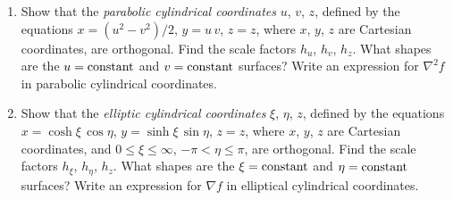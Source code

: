 {\begin{enumerate}
\item Show that the {\em parabolic cylindrical coordinates}\/ $u$, $v$, $z$, defined
by the equations $x=(u^2-v^2)/2$, $y=u\,v$, $z=z$, where $x$, $y$, $z$ are Cartesian
coordinates, are orthogonal. Find the scale factors $h_u$, $h_v$, $h_z$.
What shapes are the $u={\rm constant}$ and $v={\rm constant}$ surfaces?
Write an expression for $\nabla^2 f$ in parabolic cylindrical coordinates.

\item Show that the {\em elliptic cylindrical coordinates}\/ $\xi$, $\eta$, $z$, defined
by the equations $x=\cosh\xi\,\cos\eta$, $y=\sinh\xi\,\sin\eta$, $z=z$, where $x$, $y$, $z$ are Cartesian
coordinates, and $0\leq \xi\leq \infty$, $-\pi<\eta \leq \pi$, are orthogonal. Find the scale factors $h_\xi$, $h_\eta$, $h_z$.
What  shapes are the $\xi={\rm constant}$ and $\eta={\rm constant}$ surfaces?
Write an expression for $\nabla f$ in elliptical cylindrical coordinates.

\end{enumerate}}
